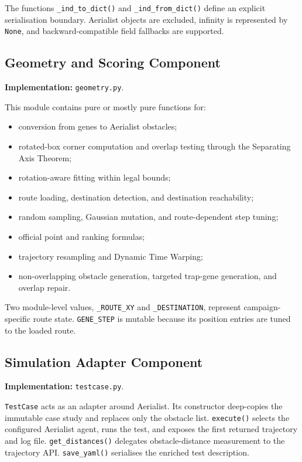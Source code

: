 \documentclass[11pt,a4paper,openany]{report}
\newcommand{\code}[1]{\texttt{#1}}
\begin{document}
The functions \code{\_ind\_to\_dict()} and \code{\_ind\_from\_dict()} define an explicit serialisation boundary. Aerialist objects are excluded, infinity is represented by \code{None}, and backward-compatible field fallbacks are supported.

\subsection{Geometry and Scoring Component}
\textbf{Implementation:} \code{geometry.py}.

This module contains pure or mostly pure functions for:
\begin{itemize}
  \item conversion from genes to Aerialist obstacles;
  \item rotated-box corner computation and overlap testing through the Separating Axis Theorem;
  \item rotation-aware fitting within legal bounds;
  \item route loading, destination detection, and destination reachability;
  \item random sampling, Gaussian mutation, and route-dependent step tuning;
  \item official point and ranking formulas;
  \item trajectory resampling and Dynamic Time Warping;
  \item non-overlapping obstacle generation, targeted trap-gene generation, and overlap repair.
\end{itemize}

Two module-level values, \code{\_ROUTE\_XY} and \code{\_DESTINATION}, represent campaign-specific route state. \code{GENE\_STEP} is mutable because its position entries are tuned to the loaded route.

\subsection{Simulation Adapter Component}
\textbf{Implementation:} \code{testcase.py}.

\code{TestCase} acts as an adapter around Aerialist. Its constructor deep-copies the immutable case study and replaces only the obstacle list. \code{execute()} selects the configured Aerialist agent, runs the test, and exposes the first returned trajectory and log file. \code{get\_distances()} delegates obstacle-distance measurement to the trajectory API. \code{save\_yaml()} serialises the enriched test description.
\end{document}
